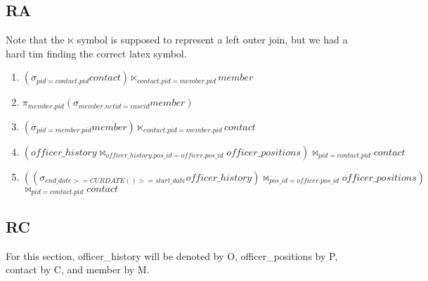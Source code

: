 \documentclass{article}
\begin{document}
\subsection{RA}
Note that the $\ltimes$ symbol is supposed to represent a left outer join, but we had a hard tim finding the correct latex symbol.

\begin{enumerate}
\item $\left(\sigma_{pid=contact.pid} contact \right) \ltimes_{contact.pid=member.pid} member$  
\item $\pi_{member.pid}\left(\sigma_{member.netid=caseid} member\right)$
\item $\left(\sigma_{pid=member.pid} member \right) \ltimes_{contact.pid=member.pid} contact$
\item $ \left(officer\_history \bowtie_{officer\_history.pos\_id=officer.pos\_id} officer\_positions\right) \bowtie_{pid=contact.pid} contact$
\item $ \left(\left(\sigma_{end\_date>=CURDATE()>=start\_date}officer\_history\right) \bowtie_{pos\_id=officer.pos\_id} officer\_positions\right) $ $\bowtie_{pid=contact.pid} contact$
\end{enumerate}

\subsection{RC}

For this section, officer\_history will be denoted by O, officer\_positions by P, contact by C, and member by M.
\end{document}
